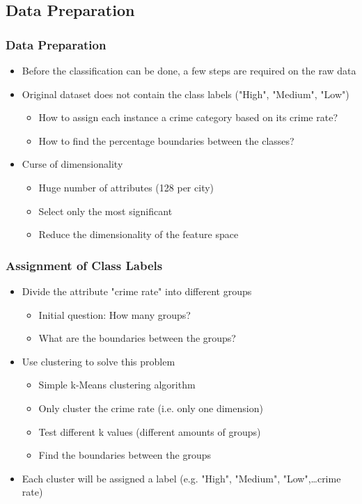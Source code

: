 \mode*

\begin{frame}
	\section{Data Preparation}
	\frametitle{Data Preparation}
	\onslide<+->
        \begin{itemize}
          \item<+-> Before the classification can be done, a few steps are required on the raw data
          \item<+-> Original dataset does not contain the class labels ("High", "Medium", "Low")
            \begin{itemize}
              \item<+-> How to assign each instance a crime category based on its crime rate?
              \item<+-> How to find the percentage boundaries between the classes?
            \end{itemize}
          \item<+-> Curse of dimensionality
            \begin{itemize}
              \item<+-> Huge number of attributes (128 per city)
              \item<+-> Select only the most significant
              \item<+-> Reduce the dimensionality of the feature space
            \end{itemize}
        \end{itemize}
\end{frame}

\begin{frame}
  \frametitle{Assignment of Class Labels}
  \onslide<+->
  \begin{itemize}
    \item<+-> Divide the attribute "crime rate" into different groups
      \begin{itemize}
        \item<+-> Initial question: How many groups?
        \item<+-> What are the boundaries between the groups?
      \end{itemize}
    \item<+-> Use clustering to solve this problem
      \begin{itemize}
        \item<+-> Simple k-Means clustering algorithm
        \item<+-> Only cluster the crime rate (i.e. only one dimension)
        \item<+-> Test different k values (different amounts of groups)
        \item<+-> Find the boundaries between the groups
      \end{itemize}
    \item<+-> Each cluster will be assigned a label (e.g. "High", "Medium", "Low",\ldots crime rate)
  \end{itemize}
\end{frame}

